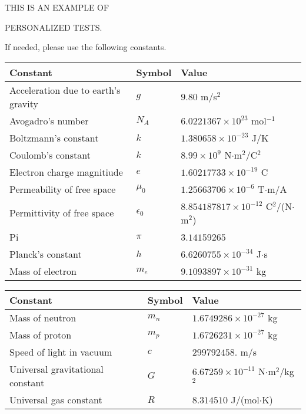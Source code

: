 \documentclass[12pt]{article}
\begin{document}
   
   
   
 \vspace{0.2in}
 
 
{\Huge  THIS IS AN EXAMPLE OF}
 
{\Huge  PERSONALIZED TESTS. }
 
If needed, please use the following constants.
 
 
 
\noindent\begin{tabular}{|l|l|l|}
\hline
Constant & Symbol & Value \\
\hline
Acceleration due to earth's gravity &
$g$ &
 $ 9.80 $
m/s$^2$ \\
\hline
Avogadro's number &
$N_A$ &
 $ 6.0221367 \times 10^{23} $
mol$^{-1}$ \\
\hline
Boltzmann's constant &
$k$ &
 $ 1.380658 \times 10^{-23} $
J/K \\
\hline
Coulomb's constant &
$k$ &
 $ 8.99 \times 10^{9} $
N$\cdot $m$^2$/C$^2$ \\
\hline
Electron charge magnitiude &
$e$ &
 $ 1.60217733 \times 10^{-19} $
C \\
\hline
Permeability of free space &
$\mu _0$ &
 $ 1.25663706 \times 10^{-6} $
T$\cdot $m/A \\
\hline
Permittivity of free space &
$\epsilon _0$ &
 $ 8.854187817 \times 10^{-12} $
C$^2$/(N$\cdot $m$^2$) \\
\hline
Pi &
$\pi$ &
 $ 3.14159265 $
$ $ \\
\hline
Planck's constant &
$h$ &
 $ 6.6260755 \times 10^{-34} $
J$\cdot $s \\
\hline
Mass of electron &
$m_e$ &
 $ 9.1093897 \times 10^{-31} $
kg \\
\hline
\end{tabular}
 
 
\noindent\begin{tabular}{|l|l|l|}
\hline
Constant & Symbol & Value \\
\hline
Mass of neutron &
$m_n$ &
 $ 1.6749286 \times 10^{-27} $
kg \\
\hline
Mass of proton &
$m_p$ &
 $ 1.6726231 \times 10^{-27} $
kg \\
\hline
Speed of light in vacuum &
$c$ &
 $ 299792458. $
m/s \\
\hline
Universal gravitational constant &
$G$ &
 $ 6.67259 \times 10^{-11} $
N$\cdot $m$^2$/kg$^2$ \\
\hline
Universal gas constant &
$R$ &
 $ 8.314510 $
J/(mol$\cdot $K) \\
\hline
\end{tabular}
 
\end{document}
